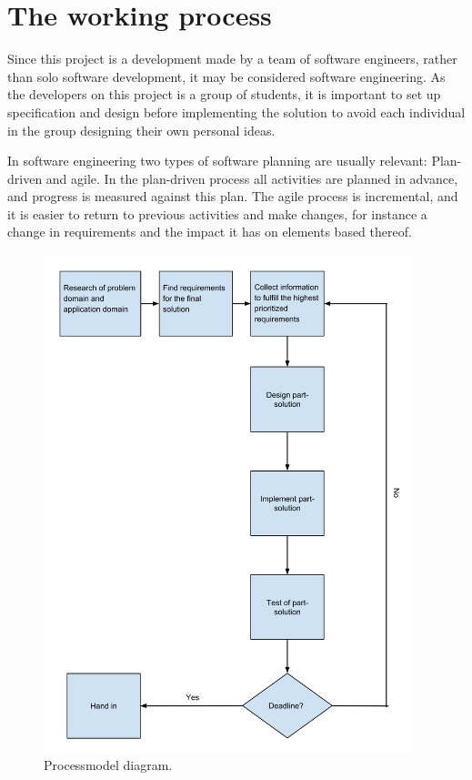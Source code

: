 \chapter{The working process}
Since this project is a development made by a team of software engineers, rather than solo software development, it may be considered software engineering. As the developers on this project is a group of students, it is important to set up specification and design before implementing the solution  to avoid each individual in the group designing their own personal ideas.

In software engineering two types of software planning are usually relevant: Plan-driven and agile. In the plan-driven process all activities are planned in advance, and progress is measured against this plan. The agile process is incremental, and it is easier to return to previous activities and make changes, for instance a change in requirements and the impact it has on elements based thereof.

\begin{figure}[h!]
\centering
\includegraphics[width=0.95\textwidth]{figures/ProcessmodelDiagram.png}
\caption{Processmodel diagram.}
\label{fig:processmodelDiagram}
\end{figure}

